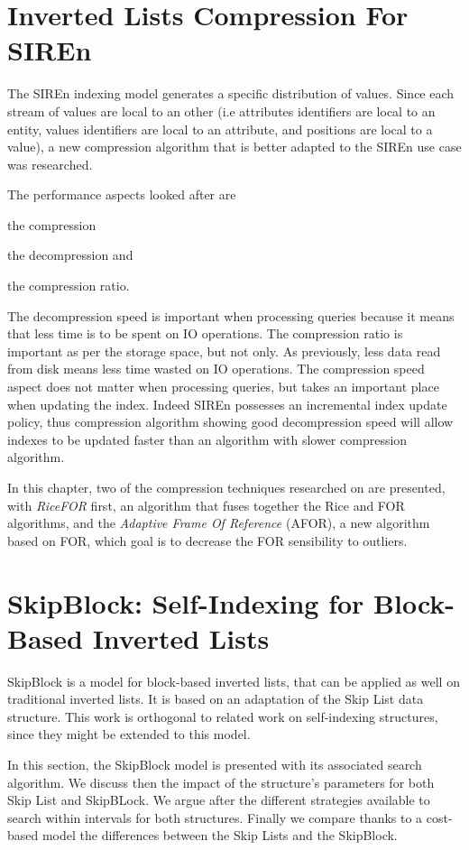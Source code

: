 \chapter{Inverted Lists Compression For SIREn}{%
The SIREn indexing model generates a specific distribution of values. Since
each stream of values are local to an other (i.e attributes identifiers are
local to an entity, values identifiers are local to an attribute, and positions
are local to a value), a new compression algorithm that is better adapted to
the SIREn use case was researched.

The performance aspects looked after are
\begin{inparaenum}[(1)]
\item the compression
\item the decompression and
\item the compression ratio.
\end{inparaenum}
The decompression speed is important when processing queries because it means
that less time is to be spent on IO operations. The compression ratio is
important as per the storage space, but not only. As previously, less data
read from disk means less time wasted on IO operations. The compression speed
aspect does not matter when processing queries, but takes an important place
when updating the index. Indeed SIREn possesses an incremental index update
policy, thus compression algorithm showing good decompression speed will allow
indexes to be updated faster than an algorithm with slower compression
algorithm.

In this chapter, two of the compression techniques researched on are presented,
with \emph{RiceFOR} first, an algorithm that fuses together the Rice and FOR
algorithms, and the \emph{Adaptive Frame Of Reference} (AFOR), a new algorithm
based on FOR, which goal is to decrease the FOR sensibility to outliers.
}%
\label{chap:cmp-methods}


\chapter{SkipBlock: Self-Indexing for Block-Based Inverted Lists}{%
SkipBlock is a model for block-based inverted lists, that can be applied as
well on traditional inverted lists. It is based on an adaptation of the Skip
List data structure. This work is orthogonal to related work on self-indexing
structures, since they might be extended to this model.

In this section, the SkipBlock model is presented with its associated search
algorithm. We discuss then the impact of the structure's parameters for both
Skip List and SkipBLock. We argue after the different strategies available to
search within intervals for both structures. Finally we compare thanks to a
cost-based model the differences between the Skip Lists and the SkipBlock. }
\label{chap:skipblock}
